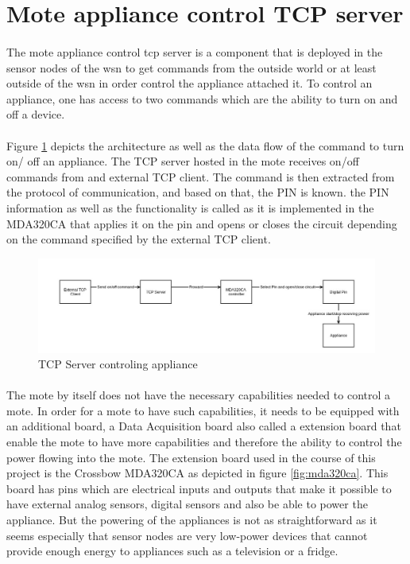 \documentclass[oneside,12pt,a4paper,final]{book}
\begin{document}
\section{ Mote appliance control TCP server}
\paragraph{}
The mote appliance control \gls{tcp} server is a component that is deployed in the sensor nodes of the \gls{wsn} to get commands from the outside world or at least outside of the \gls{wsn} in order control the appliance attached it. To control an appliance, one has access to two commands which are the ability to turn on and off a device.
\paragraph{}
Figure \ref{fig:appliance_control} depicts the architecture as well as the data flow of the command to turn on/ off an appliance. The TCP server hosted in the mote receives on/off commands from and external TCP client. The command is then extracted from the protocol of communication, and based on that, the PIN is known. the PIN information as well as the functionality is called as it is implemented in the MDA320CA that applies it on the pin and opens or closes the circuit depending on the command specified by the external TCP client.

\begin{figure}[htbp]
\centering
\includegraphics[scale=0.35]{img/appliance_control.jpg}
\caption{TCP Server controling appliance}
\label{fig:appliance_control}
\end{figure}

\paragraph{}
The mote by itself does not have the necessary capabilities needed to control a mote. In order for a mote to have such capabilities, it needs to be equipped with an additional board, a Data Acquisition board also called a extension board that enable the mote to have more capabilities and therefore the ability to control the power flowing into the mote. The extension board used in the course of this project is the Crossbow MDA320CA as depicted in figure \ref{fig:mda320ca}. This board has pins which are electrical inputs and outputs that make it possible to have external analog sensors, digital sensors and also be able to power the appliance. But the powering of the appliances is not as straightforward as it seems especially that sensor nodes are very low-power devices that cannot provide enough energy to appliances such as a television or a fridge.
\end{document}

